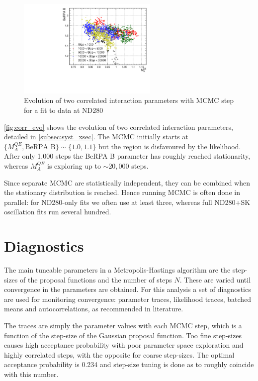\begin{figure}[h]
	\includegraphics[width=0.6\textwidth, trim={0mm 0mm 0mm 0mm}, clip,page=1]{figures/mcmc/corr_maqe_berpab}
	\caption{Evolution of two correlated interaction parameters with MCMC step for a fit to data at ND280}
	\label{fig:corr_evo}
\end{figure}
\autoref{fig:corr_evo} shows the evolution of two correlated interaction parameters, detailed in \autoref{subsec:syst_xsec}. The MCMC initially starts at $\{M_A^{QE}, \text{BeRPA B}\} \sim \{1.0, 1.1\}$ but the region is disfavoured by the likelihood. After only 1,000 steps the BeRPA B parameter has roughly reached stationarity, whereas $M_A^{QE}$ is exploring up to $\sim20,000$ steps.

Since separate MCMC are statistically independent, they can be combined when the stationary distribution is reached. Hence running MCMC is often done in parallel: for ND280-only fits we often use at least three, whereas full ND280+SK oscillation fits run several hundred.

\section{Diagnostics}
The main tuneable parameters in a Metropolis-Hastings algorithm are the step-sizes of the proposal functions and the number of steps $N$. These are varied until convergence in the parameters are obtained. For this analysis a set of diagnostics are used for monitoring convergence: parameter traces, likelihood traces, batched means and autocorrelations, as recommended in literature\cite{mcmc_handbook}.

The traces are simply the parameter values with each MCMC step, which is a function of the step-size of the Gaussian proposal function. Too fine step-sizes causes high acceptance probability with poor parameter space exploration and highly correlated steps, with the opposite for coarse step-sizes. The optimal acceptance probability is 0.234\cite{step_prop,mcmc_handbook} and step-size tuning is done as to roughly coincide with this number.

